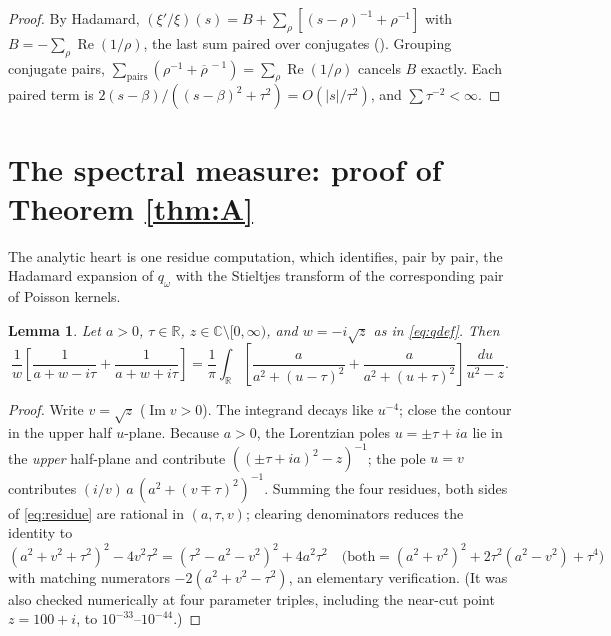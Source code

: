 \documentclass[11pt,reqno]{amsart}
\theoremstyle{plain}
\newtheorem{lemma}[theorem]{Lemma}
\theoremstyle{definition}
\newcommand{\R}{\mathbb{R}}
\newcommand{\C}{\mathbb{C}}
\newcommand{\Rp}{\operatorname{Re}}
\newcommand{\Ip}{\operatorname{Im}}
\begin{document}
\begin{proof}
By Hadamard, $(\xi'/\xi)(s)=B+\sum_\rho[(s-\rho)^{-1}+\rho^{-1}]$ with
$B=-\sum_\rho\Rp(1/\rho)$, the last sum paired over conjugates
(\cite[\S12]{Davenport}). Grouping conjugate pairs,
$\sum_{\text{pairs}}(\rho^{-1}+\overline\rho^{\,-1})=\sum_\rho\Rp(1/\rho)$ cancels $B$
exactly. Each paired term is $2(s-\beta)/((s-\beta)^2+\tau^2)=O(|s|/\tau^2)$, and
$\sum\tau^{-2}<\infty$.
\end{proof}

\section{The spectral measure: proof of Theorem \ref{thm:A}}\label{sec:thmA}

The analytic heart is one residue computation, which identifies, pair by pair, the Hadamard
expansion of $q_\omega$ with the Stieltjes transform of the corresponding pair of Poisson
kernels.

\begin{lemma}\label{lem:residue}
Let $a>0$, $\tau\in\R$, $z\in\C\setminus[0,\infty)$, and $w=-i\sqrt z$ as in \eqref{eq:qdef}.
Then
\begin{equation}\label{eq:residue}
  \frac1w\left[\frac1{a+w-i\tau}+\frac1{a+w+i\tau}\right]
  =\frac1\pi\int_\R\left[\frac{a}{a^2+(u-\tau)^2}+\frac{a}{a^2+(u+\tau)^2}\right]
  \frac{du}{u^2-z}.
\end{equation}
\end{lemma}

\begin{proof}
Write $v=\sqrt z$ ($\Ip v>0$). The integrand decays like $u^{-4}$; close the contour in the
upper half $u$-plane. Because $a>0$, the Lorentzian poles $u=\pm\tau+ia$ lie in the
\emph{upper} half-plane and contribute $((\pm\tau+ia)^2-z)^{-1}$; the pole $u=v$ contributes
$(i/v)\,a\,(a^2+(v\mp\tau)^2)^{-1}$. Summing the four residues, both sides of
\eqref{eq:residue} are rational in $(a,\tau,v)$; clearing denominators reduces the identity to
\[
  (a^2+v^2+\tau^2)^2-4v^2\tau^2=(\tau^2-a^2-v^2)^2+4a^2\tau^2
  \quad\bigl(\text{both}=(a^2+v^2)^2+2\tau^2(a^2-v^2)+\tau^4\bigr)
\]
with matching numerators $-2(a^2+v^2-\tau^2)$, an elementary verification. (It was also checked
numerically at four parameter triples, including the near-cut point $z=100+i$, to
$10^{-33}$--$10^{-44}$.)
\end{proof}
\end{document}
